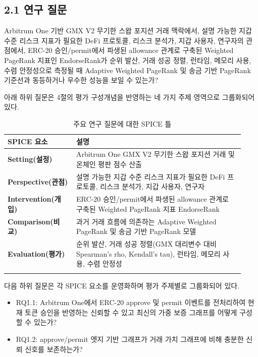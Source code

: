 \subsection*{2.1 연구 질문}
\label{sec:research-questions}

Arbitrum One 기반 GMX V2 무기한 스왑 포지션 거래 맥락에서, 설명 가능한 지갑 수준 리스크 지표가 필요한 DeFi 프로토콜, 리스크 분석가, 지갑 사용자, 연구자의 관점에서, ERC-20 승인/permit에서 파생된 allowance 관계로 구축된 Weighted PageRank 지표인 EndorseRank가 순위 발산, 거래 성공 정렬, 런타임, 메모리 사용, 수렴 안정성으로 측정될 때 Adaptive Weighted PageRank 및 송금 기반 PageRank 기준선과 동등하거나 우수한 성능을 보일 수 있는가?


아래 하위 질문은 4절의 평가 구성개념을 반영하는 네 가지 주제 영역으로 그룹화되어 있다.


\begin{longtable}{>{\raggedright\arraybackslash}p{0.27\linewidth}>{\raggedright\arraybackslash}p{0.66\linewidth}}
\caption{주요 연구 질문에 대한 SPICE 틀}\\
\toprule
\textbf{SPICE 요소} & 설명 \\
\midrule
\textbf{Setting(설정)} & Arbitrum One GMX V2 무기한 스왑 포지션 거래 및 온체인 평판 점수 산출 \\
\addlinespace
\textbf{Perspective(관점)} & 설명 가능한 지갑 수준 리스크 지표가 필요한 DeFi 프로토콜, 리스크 분석가, 지갑 사용자, 연구자 \\
\addlinespace
\textbf{Intervention(개입)} & ERC-20 승인/permit에서 파생된 allowance 관계로 구축된 Weighted PageRank 지표 EndorseRank \\
\addlinespace
\textbf{Comparison(비교)} & 과거 거래 흐름에 의존하는 Adaptive Weighted PageRank 및 송금 기반 PageRank 모델 \\
\addlinespace
\textbf{Evaluation(평가)} & 순위 발산, 거래 성공 정렬(GMX 대리변수 대비 Spearman's rho, Kendall's tau), 런타임, 메모리 사용, 수렴 안정성 \\
\addlinespace
\bottomrule
\end{longtable}

다음 하위 질문은 각 SPICE 요소를 운영화하며 평가 주제별로 그룹화되어 있다.


\begin{itemize}
\item[\textendash] RQ1.1: Arbitrum One에서 ERC-20 approve 및 permit 이벤트를 전처리하여 현재 토큰 승인을 반영하는 신뢰할 수 있고 최신의 가중 보증 그래프를 어떻게 구성할 수 있는가?
\item[\textendash] RQ1.2: approve/permit 엣지 기반 그래프가 거래 가치 그래프에 비해 충분한 신뢰 신호를 보존하는가?
\end{itemize}

